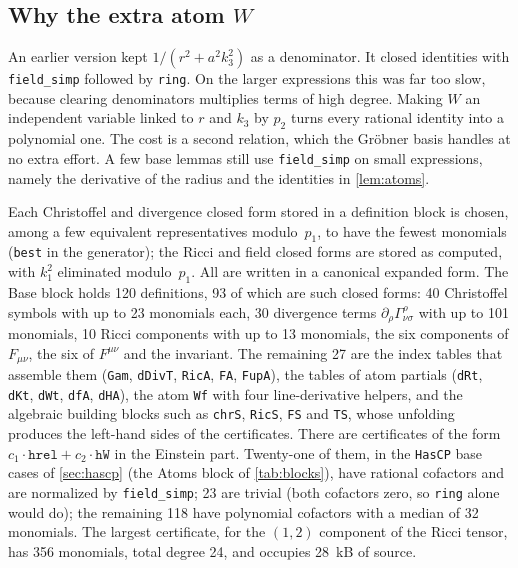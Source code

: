 \documentclass[11pt]{article}
\theoremstyle{definition}
\theoremstyle{remark}
\newcommand{\lean}[1]{\lstinline[basicstyle=\ttfamily\normalsize,columns=fullflexible,breaklines=false]{#1}}
\begin{document}
\subsection{Why the extra atom \texorpdfstring{$W$}{W}}

An earlier version kept $1/(r^2+a^2k_3^2)$ as a denominator.
It closed identities with \lean{field_simp} followed by \lean{ring}.
On the larger expressions this was far too slow, because clearing denominators multiplies terms of high degree.
Making $W$ an independent variable linked to $r$ and $k_3$ by $p_2$ turns every rational identity into a polynomial one.
The cost is a second relation, which the Gr\"obner basis handles at no extra effort.
A few base lemmas still use \lean{field_simp} on small expressions, namely the derivative of the radius and the identities in \cref{lem:atoms}.

Each Christoffel and divergence closed form stored in a definition block is chosen, among a few equivalent representatives modulo~$p_1$, to have the fewest monomials (\lean{best} in the generator); the Ricci and field closed forms are stored as computed, with $k_1^2$ eliminated modulo~$p_1$.
All are written in a canonical expanded form.
The Base block holds 120 definitions, 93 of which are such closed forms: 40 Christoffel symbols with up to 23 monomials each, 30 divergence terms $\partial_\rho\Gamma^\rho_{\nu\sigma}$ with up to 101 monomials, 10 Ricci components with up to 13 monomials, the six components of $F_{\mu\nu}$, the six of $F^{\mu\nu}$ and the invariant.
The remaining 27 are the index tables that assemble them (\lean{Gam}, \lean{dDivT}, \lean{RicA}, \lean{FA}, \lean{FupA}), the tables of atom partials (\lean{dRt}, \lean{dKt}, \lean{dWt}, \lean{dfA}, \lean{dHA}), the atom \lean{Wf} with four line-derivative helpers, and the algebraic building blocks such as \lean{chrS}, \lean{RicS}, \lean{FS} and \lean{TS}, whose unfolding produces the left-hand sides of the certificates.
There are \NumCert{} certificates of the form $c_1\cdot\mathtt{hrel}+c_2\cdot\mathtt{hW}$ in the Einstein part.
Twenty-one of them, in the \lean{HasCP} base cases of \cref{sec:hascp} (the Atoms block of \cref{tab:blocks}), have rational cofactors and are normalized by \lean{field_simp}; 23 are trivial (both cofactors zero, so \lean{ring} alone would do); the remaining 118 have polynomial cofactors with a median of 32 monomials.
The largest certificate, for the $(1,2)$ component of the Ricci tensor, has 356 monomials, total degree 24, and occupies 28~kB of source.
\end{document}
